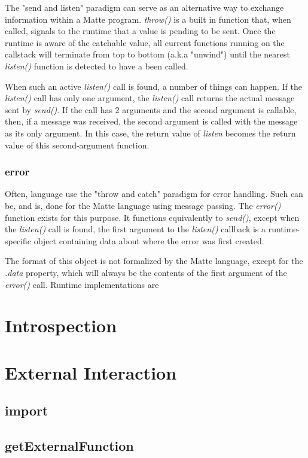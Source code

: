 \documentclass[12pt,letterpaper]{report}
\begin{document}
The "send and listen" paradigm can serve as an alternative way to exchange information within 
a Matte program. \textit{throw()} is a built in function that, when called, signals to the runtime
that a value is pending to be sent. Once the runtime is aware of the catchable value, all current 
functions running on the callstack will terminate from top to bottom (a.k.a "unwind") until the nearest
\textit{listen()} function is detected to have a been called.

When such an active \textit{listen()} call is found, a number of things can happen.
If the \textit{listen()} call has only one argument, the \textit{listen()} call returns 
the actual message sent by \textit{send()}. If the call has 2 arguments and the second 
argument is callable, then, if a message was received, the second argument is called 
with the message as its only argument. In this case, the return value of \textit{listen} 
becomes the return value of this second-argument function.



\subsection{error}

Often, language use the "throw and catch" paradigm for error handling. Such can be, and is, done 
for the Matte language using message passing. The \textit{error()} function exists for this purpose. It functions 
equivalently to \textit{send()}, except when the \textit{listen()} call is found, the first argument 
to the \textit{listen()} callback is a runtime-specific object containing data about where the error 
was first created. 

The format of this object is not formalized by the Matte language, except for the 
\textit{.data} property, which will always be the contents of the first argument 
of the \textit{error()} call. Runtime implementations are 

\chapter{Introspection}
\chapter{External Interaction}
\section{import}
\section{getExternalFunction}
\end{document}
